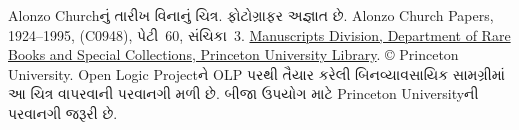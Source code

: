 Alonzo Churchનું તારીખ વિનાનું ચિત્ર. ફોટોગ્રાફર અજ્ઞાત છે.
Alonzo Church Papers, 1924--1995, (C0948), પેટી~60, સંચિકા~3.
\href{http://rbsc.princeton.edu/divisions/manuscripts-division}{Manuscripts
Division, Department of Rare Books and Special Collections, Princeton
University Library}. \copyright{} Princeton University. Open Logic Projectને
OLP પરથી તૈયાર કરેલી બિનવ્યાવસાયિક સામગ્રીમાં આ ચિત્ર વાપરવાની પરવાનગી
મળી છે. બીજા ઉપયોગ માટે Princeton Universityની પરવાનગી જરૂરી છે.

